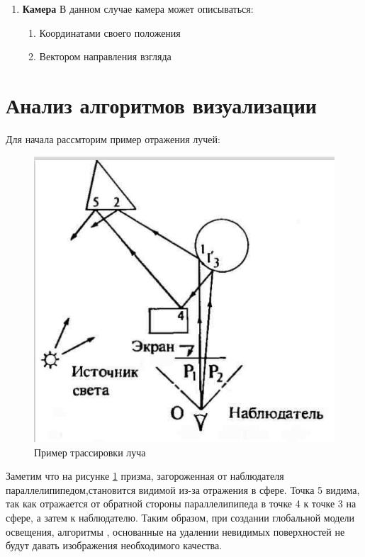 \documentclass[a4paper,14pt, unknownkeysallowed]{extreport}
\begin{document}
\begin{enumerate}
	\item \textbf{Камера}
	В данном случае камера может описываться:
	\begin{enumerate}
		\item Координатами своего положения
		\item Вектором направления взгляда
	\end{enumerate}
	


\end{enumerate}




\section[Анализ алгоритмов создания отражений]{Анализ алгоритмов визуализации}

Для начала рассмторим пример отражения лучей:

\begin{figure}[h]
	\centering
	\includegraphics{global_model_light.png}
	\caption{Пример трассировки луча}
	\label{fig:global_model_light}
\end{figure} 

Заметим что на рисунке \ref{fig:global_model_light}  призма, загороженная от наблюдателя параллелипипедом,становится видимой из-за отражения в сфере.
Точка 5 видима, так как отражается от обратной стороны параллелипипеда в точке 4 к точке 3 на сфере, а затем к наблюдателю.
Таким образом, при создании глобальной модели освещения, алгоритмы , основанные на удалении невидимых поверхностей не будут давать изображения необходимого качества.
\end{document}
